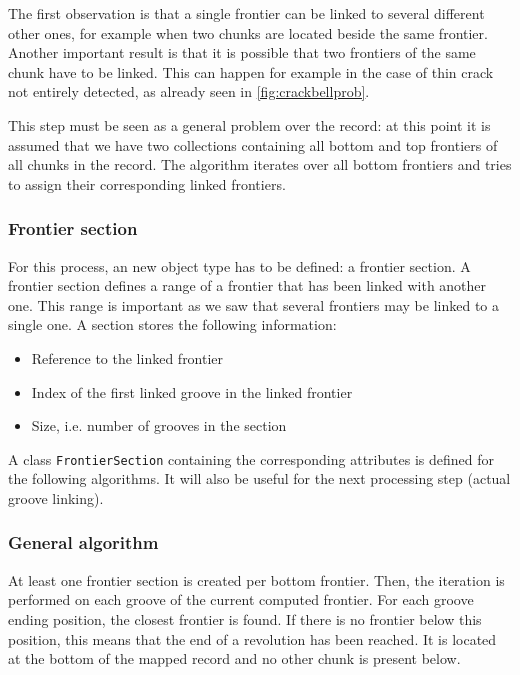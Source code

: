 The first observation is that a single frontier can be linked to several different other ones, for example when two chunks are located beside the same frontier. Another important result is that it is possible that two frontiers of the same chunk have to be linked. This can happen for example in the case of thin crack not entirely detected, as already seen in \autoref{fig:crackbellprob}.

This step must be seen as a general problem over the record: at this point it is assumed that we have two collections containing all bottom and top frontiers of all chunks in the record. The algorithm iterates over all bottom frontiers and tries to assign their corresponding linked frontiers.

\subsubsection{Frontier section}

For this process, an new object type has to be defined: a frontier section. A frontier section defines a range of a frontier that has been linked with another one. This range is important as we saw that several frontiers may be linked to a single one. A section stores the following information:

\begin{itemize}
\item Reference to the linked frontier
\item Index of the first linked groove in the linked frontier
\item Size, i.e. number of grooves in the section
\end{itemize}

A class \texttt{FrontierSection} containing the corresponding attributes is defined for the following algorithms. It will also be useful for the next processing step (actual groove linking).

\subsubsection{General algorithm}

At least one frontier section is created per bottom frontier. Then, the iteration is performed on each groove of the current computed frontier. For each groove ending position, the closest frontier is found. If there is no frontier below this position, this means that the end of a revolution has been reached. It is located at the bottom of the mapped record and no other chunk is present below.

